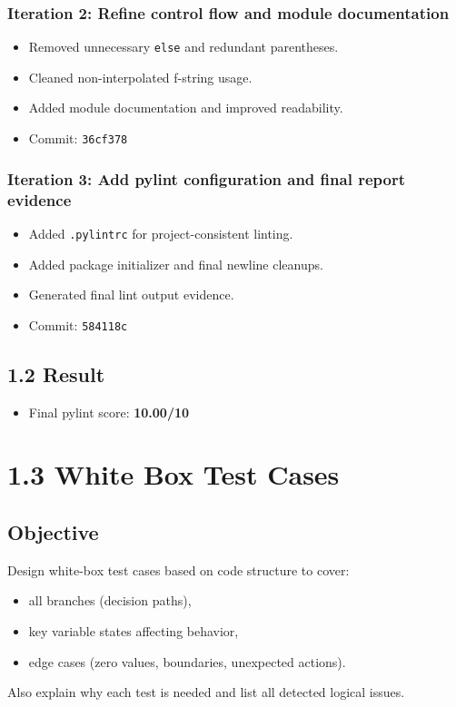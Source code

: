 \documentclass[11pt,a4paper]{article}
\begin{document}
\subsubsection*{Iteration 2: Refine control flow and module documentation}
\begin{itemize}
  \item Removed unnecessary \texttt{else} and redundant parentheses.
  \item Cleaned non-interpolated f-string usage.
  \item Added module documentation and improved readability.
  \item Commit: \texttt{36cf378}
\end{itemize}

\subsubsection*{Iteration 3: Add pylint configuration and final report evidence}
\begin{itemize}
  \item Added \texttt{.pylintrc} for project-consistent linting.
  \item Added package initializer and final newline cleanups.
  \item Generated final lint output evidence.
  \item Commit: \texttt{584118c}
\end{itemize}

\subsection*{1.2 Result}
\begin{itemize}
  \item Final pylint score: \textbf{10.00/10}
\end{itemize}

\section*{1.3 White Box Test Cases}

\subsection*{Objective}
Design white-box test cases based on code structure to cover:
\begin{itemize}
  \item all branches (decision paths),
  \item key variable states affecting behavior,
  \item edge cases (zero values, boundaries, unexpected actions).
\end{itemize}
Also explain why each test is needed and list all detected logical issues.
\end{document}
